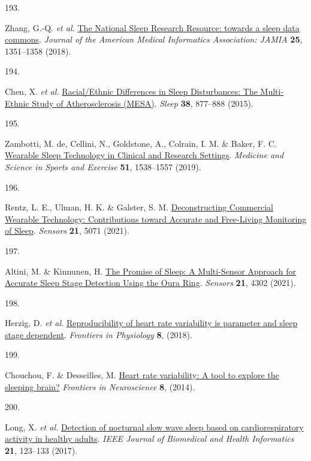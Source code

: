 \documentclass[
  10pt,
]{scrbook}
\newlength{\cslhangindent}
\newlength{\csllabelwidth}
\newlength{\cslentryspacingunit} %
\newenvironment{CSLReferences}[2] %
 {%
  \setlength{\parindent}{0pt}
  \ifodd #1
  \let\oldpar\par
  \def\par{\hangindent=\cslhangindent\oldpar}
  \fi
  \setlength{\parskip}{#2\cslentryspacingunit}
 }%
 {}
\newcommand{\CSLLeftMargin}[1]{\parbox[t]{\csllabelwidth}{#1}}
\newcommand{\CSLRightInline}[1]{\parbox[t]{\linewidth - \csllabelwidth}{#1}\break}
\let\originaltextbf\textbf
\renewcommand{\textbf}[1]{\textcolor{color1}{\textsf{\originaltextbf{#1}}}}
\begin{document}
\begin{CSLReferences}{0}{0}
\leavevmode{}%
\CSLLeftMargin{193. }%
\CSLRightInline{Zhang, G.-Q. \emph{et al.}
\href{https://doi.org/10.1093/jamia/ocy064}{The National Sleep Research
Resource: towards a sleep data commons}. \emph{Journal of the American
Medical Informatics Association: JAMIA} \textbf{25}, 1351--1358 (2018).}

\leavevmode{}%
\CSLLeftMargin{194. }%
\CSLRightInline{Chen, X. \emph{et al.}
\href{https://doi.org/10.5665/sleep.4732}{Racial/Ethnic Differences in
Sleep Disturbances: The Multi-Ethnic Study of Atherosclerosis (MESA)}.
\emph{Sleep} \textbf{38}, 877--888 (2015).}

\leavevmode{}%
\CSLLeftMargin{195. }%
\CSLRightInline{Zambotti, M. de, Cellini, N., Goldstone, A., Colrain, I.
M. \& Baker, F. C.
\href{https://doi.org/10.1249/MSS.0000000000001947}{Wearable Sleep
Technology in Clinical and Research Settings}. \emph{Medicine and
Science in Sports and Exercise} \textbf{51}, 1538--1557 (2019).}

\leavevmode{}%
\CSLLeftMargin{196. }%
\CSLRightInline{Rentz, L. E., Ulman, H. K. \& Galster, S. M.
\href{https://doi.org/10.3390/s21155071}{Deconstructing Commercial
Wearable Technology: Contributions toward Accurate and Free-Living
Monitoring of Sleep}. \emph{Sensors} \textbf{21}, 5071 (2021).}

\leavevmode{}%
\CSLLeftMargin{197. }%
\CSLRightInline{Altini, M. \& Kinnunen, H.
\href{https://doi.org/10.3390/s21134302}{The Promise of Sleep: A
Multi-Sensor Approach for Accurate Sleep Stage Detection Using the Oura
Ring}. \emph{Sensors} \textbf{21}, 4302 (2021).}

\leavevmode{}%
\CSLLeftMargin{198. }%
\CSLRightInline{Herzig, D. \emph{et al.}
\href{https://www.frontiersin.org/articles/10.3389/fphys.2017.01100}{Reproducibility
of heart rate variability is parameter and sleep stage dependent}.
\emph{Frontiers in Physiology} \textbf{8}, (2018).}

\leavevmode{}%
\CSLLeftMargin{199. }%
\CSLRightInline{Chouchou, F. \& Desseilles, M.
\href{https://www.frontiersin.org/articles/10.3389/fnins.2014.00402}{Heart
rate variability: A tool to explore the sleeping brain?} \emph{Frontiers
in Neuroscience} \textbf{8}, (2014).}

\leavevmode{}%
\CSLLeftMargin{200. }%
\CSLRightInline{Long, X. \emph{et al.}
\href{https://doi.org/10.1109/JBHI.2015.2487446}{Detection of nocturnal
slow wave sleep based on cardiorespiratory activity in healthy adults}.
\emph{IEEE Journal of Biomedical and Health Informatics} \textbf{21},
123--133 (2017).}


\end{CSLReferences}
\end{document}
